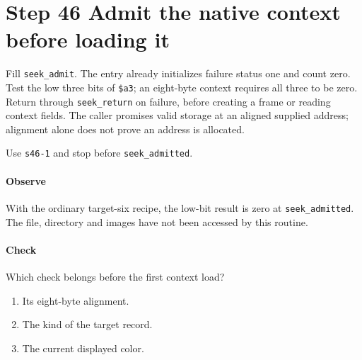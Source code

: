 \section{Step 46 Admit the native context before loading it}
Fill \texttt{seek\_admit}. The entry already initializes failure status one and count zero. Test the low three bits of \texttt{\$a3}; an eight-byte context requires all three to be zero. Return through \texttt{seek\_return} on failure, before creating a frame or reading context fields. The caller promises valid storage at an aligned supplied address; alignment alone does not prove an address is allocated.

Use \texttt{s46-1} and stop before \texttt{seek\_admitted}.

\paragraph{Observe} With the ordinary target-six recipe, the low-bit result is zero at \texttt{seek\_admitted}. The file, directory and images have not been accessed by this routine.

\paragraph{Check} Which check belongs before the first context load?
\begin{enumerate}[label=\Alph*.]
  \item Its eight-byte alignment.
  \item The kind of the target record.
  \item The current displayed color.
\end{enumerate}
